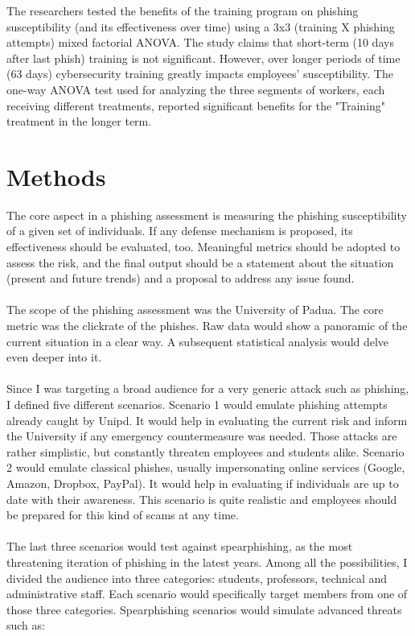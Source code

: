 \documentclass[a4paper]{article}
\begin{document}
The researchers tested the benefits of the training program on phishing susceptibility (and its effectiveness over time) using a 3x3 (training X phishing attempts) mixed factorial ANOVA. The study claims that short-term (10 days after last phish) training is not significant. However, over longer periods of time (63 days) cybersecurity training greatly impacts employees' susceptibility. The one-way ANOVA test used for analyzing the three segments of workers, each receiving different treatments, reported significant benefits for the "Training" treatment in the longer term.

\newpage

\section{Methods}

The core aspect in a phishing assessment is measuring the phishing susceptibility of a given set of individuals. If any defense mechanism is proposed, its effectiveness should be evaluated, too. Meaningful metrics should be adopted to assess the risk, and the final output should be a statement about the situation (present and future trends) and a proposal to address any issue found.
\\ \\
The scope of the phishing assessment was the University of Padua. The core metric was the clickrate of the phishes. Raw data would show a panoramic of the current situation in a clear way. A subsequent statistical analysis would delve even deeper into it.
\\ \\
Since I was targeting a broad audience for a very generic attack such as phishing, I defined five different scenarios. Scenario 1 would emulate phishing attempts already caught by Unipd. It would help in evaluating the current risk and inform the University if any emergency countermeasure was needed. Those attacks are rather simplistic, but constantly threaten employees and students alike. Scenario 2 would emulate classical phishes, usually impersonating online services (Google, Amazon, Dropbox, PayPal). It would help in evaluating if individuals are up to date with their awareness. This scenario is quite realistic and employees should be prepared for this kind of scams at any time. 
\\ \\
The last three scenarios would test against spearphishing, as the most threatening iteration of phishing in the latest years. Among all the possibilities, I divided the audience into three categories: students, professors, technical and administrative staff. Each scenario would specifically target members from one of those three categories. Spearphishing scenarios would simulate advanced threats such as:
\end{document}
